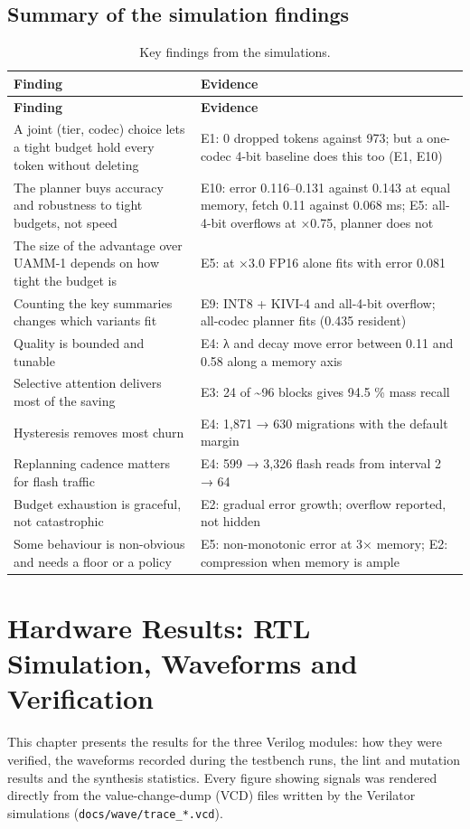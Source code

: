 \documentclass[12pt,a4paper]{report}
\begin{document}
\subsection{Summary of the simulation findings}\label{sec:8_10}
{\fontsize{8}{9.5}\selectfont\setlength{\tabcolsep}{3pt}
\begin{longtable}{>{\raggedright\arraybackslash}p{3.03in}>{\raggedright\arraybackslash}p{3.03in}}
\caption{Key findings from the simulations.}\\
\toprule
\textbf{Finding} & \textbf{Evidence} \\\midrule\endfirsthead
\toprule \textbf{Finding} & \textbf{Evidence} \\\midrule\endhead
\bottomrule\endfoot
A joint (tier, codec) choice lets a tight budget hold every token without deleting & E1: 0 dropped tokens against 973; but a one-codec 4-bit baseline does this too (E1, E10) \\
The planner buys accuracy and robustness to tight budgets, not speed & E10: error 0.116–0.131 against 0.143 at equal memory, fetch 0.11 against 0.068 ms; E5: all-4-bit overflows at ×0.75, planner does not \\
The size of the advantage over UAMM-1 depends on how tight the budget is & E5: at ×3.0 FP16 alone fits with error 0.081 \\
Counting the key summaries changes which variants fit & E9: INT8 + KIVI-4 and all-4-bit overflow; all-codec planner fits (0.435 resident) \\
Quality is bounded and tunable & E4: λ and decay move error between 0.11 and 0.58 along a memory axis \\
Selective attention delivers most of the saving & E3: 24 of \textasciitilde{}96 blocks gives 94.5 \% mass recall \\
Hysteresis removes most churn & E4: 1,871 → 630 migrations with the default margin \\
Replanning cadence matters for flash traffic & E4: 599 → 3,326 flash reads from interval 2 → 64 \\
Budget exhaustion is graceful, not catastrophic & E2: gradual error growth; overflow reported, not hidden \\
Some behaviour is non-obvious and needs a floor or a policy & E5: non-monotonic error at 3× memory; E2: compression when memory is ample \\
\bottomrule
\end{longtable}}
\section{Hardware Results: RTL Simulation, Waveforms and Verification}\label{sec:9}
This chapter presents the results for the three Verilog modules: how they were verified, the waveforms recorded during the testbench runs, the lint and mutation results and the synthesis statistics. Every figure showing signals was rendered directly from the value-change-dump (VCD) files written by the Verilator simulations (\texttt{docs/\allowbreak{}wave/\allowbreak{}trace\_\allowbreak{}\allowbreak{}*.\allowbreak{}vcd}).
\end{document}
